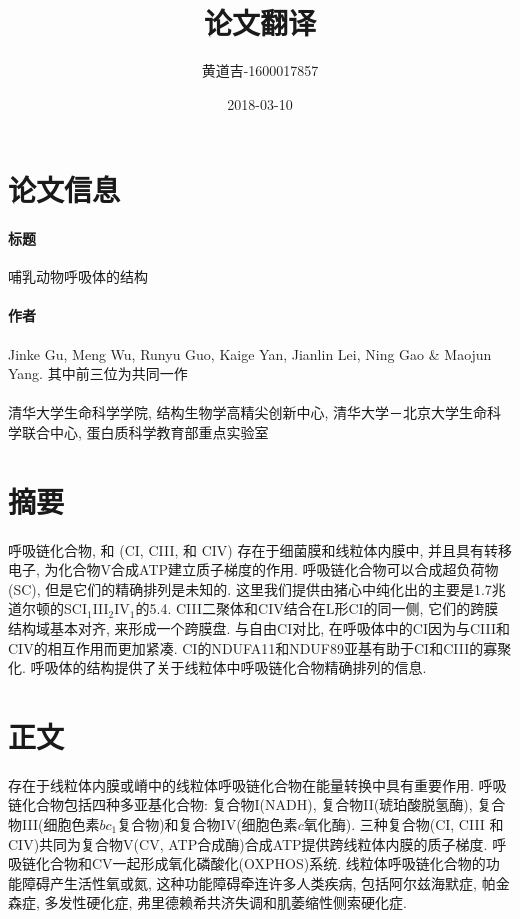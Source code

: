 \documentclass{article}
\title{论文翻译}
\date{2018-03-10}
\author{
  黄道吉-1600017857
}
\begin{document}
\maketitle

\section{论文信息}
  \paragraph{标题} 哺乳动物呼吸体的结构
  \paragraph{作者} Jinke Gu, Meng Wu, Runyu Guo, Kaige Yan, Jianlin Lei, Ning Gao \& Maojun Yang. 其中前三位为共同一作
  \paragraph{} 清华大学生命科学学院, 结构生物学高精尖创新中心, 清华大学－北京大学生命科学联合中心, 蛋白质科学教育部重点实验室
\section{摘要}
  \paragraph{}
    呼吸链化合物\uppercase\expandafter{}, \uppercase\expandafter{} 和 \uppercase\expandafter{}(CI, CIII, 和 CIV) 存在于细菌膜和线粒体内膜中, 并且具有转移电子, 为化合物V合成ATP建立质子梯度的作用. 呼吸链化合物可以合成超负荷物(SC), 但是它们的精确排列是未知的. 这里我们提供由猪心中纯化出的主要是1.7兆道尔顿的SCI$_1$III$_2$IV$_1$的5.4. CIII二聚体和CIV结合在L形CI的同一侧, 它们的跨膜结构域基本对齐, 来形成一个跨膜盘. 与自由CI对比, 在呼吸体中的CI因为与CIII和CIV的相互作用而更加紧凑. CI的NDUFA11和NDUF89亚基有助于CI和CIII的寡聚化. 呼吸体的结构提供了关于线粒体中呼吸链化合物精确排列的信息.

\section{正文}
  \paragraph{}
    存在于线粒体内膜或嵴中的线粒体呼吸链化合物在能量转换中具有重要作用. 呼吸链化合物包括四种多亚基化合物: 复合物I(NADH), 复合物II(琥珀酸脱氢酶), 复合物III(细胞色素$bc_1$复合物)和复合物IV(细胞色素$c$氧化酶). 三种复合物(CI, CIII 和 CIV)共同为复合物V(CV, ATP合成酶)合成ATP提供跨线粒体内膜的质子梯度. 呼吸链化合物和CV一起形成氧化磷酸化(OXPHOS)系统. 线粒体呼吸链化合物的功能障碍产生活性氧或氮, 这种功能障碍牵连许多人类疾病, 包括阿尔兹海默症, 帕金森症, 多发性硬化症, 弗里德赖希共济失调和肌萎缩性侧索硬化症.
\end{document}
